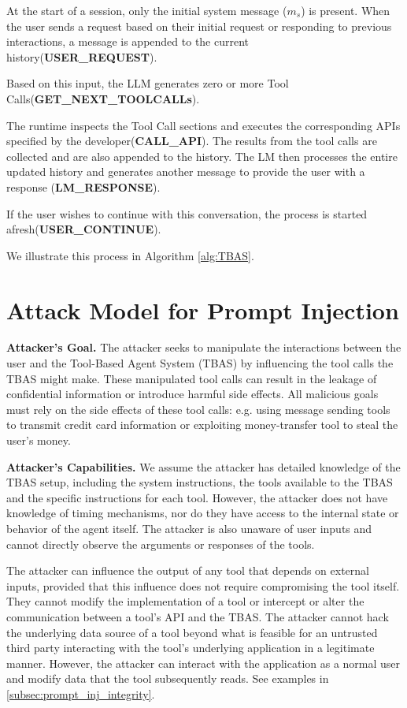 At the start of a session, only the initial system message ($m_s$) is present. When the user sends a request based on their initial request or responding to previous interactions, a message is appended to the current history(\textbf{USER\_REQUEST}). 

Based on this input, the LLM generates zero or more Tool Calls(\textbf{GET\_NEXT\_TOOLCALLs}).

The runtime inspects the Tool Call sections and executes the corresponding APIs specified by the developer(\textbf{CALL\_API}). The results from the tool calls are collected and are also appended to the history. 
The LM then processes the entire updated history and generates another message to provide the user with a response (\textbf{LM\_RESPONSE}).

If the user wishes to continue with this conversation, the process is started afresh(\textbf{USER\_CONTINUE}). 

We illustrate this process in Algorithm \ref{alg:TBAS}.

\section{Attack Model for Prompt Injection} 

\textbf{Attacker’s Goal.} The attacker seeks to manipulate the interactions between the user and the Tool-Based Agent System (TBAS) by influencing the tool calls the TBAS might make. These manipulated tool calls can result in the leakage of confidential information or introduce harmful side effects. All malicious goals must rely on the side effects of these tool calls: e.g. using message sending tools to transmit credit card information or exploiting money-transfer tool to steal the user's money.

\textbf{Attacker’s Capabilities.} 
We assume the attacker has detailed knowledge of the TBAS setup, including the system instructions, the tools available to the TBAS and the specific instructions for each tool. However, the attacker does not have knowledge of timing mechanisms, nor do they have access to the internal state or behavior of the agent itself. The attacker is also unaware of user inputs and cannot directly observe the arguments or responses of the tools.

The attacker can influence the output of any tool that depends on external inputs, provided that this influence does not require compromising the tool itself. They cannot modify the implementation of a tool or intercept or alter the communication between a tool’s API and the TBAS. The attacker cannot hack the underlying data source of a tool beyond what is feasible for an untrusted third party interacting with the tool’s underlying application in a legitimate manner. However, the attacker can interact with the application as a normal user and modify data that the tool subsequently reads. See examples in \ref{subsec:prompt_inj_integrity}.





